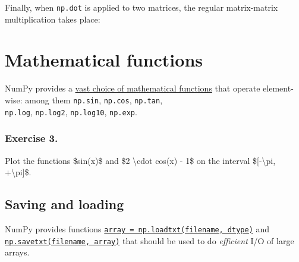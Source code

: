 \documentclass[english,serif,mathserif,xcolor=pdftex,dvipsnames,table]{beamer}
\begin{document}
\begin{Shaded}
\begin{Highlighting}[]
\end{Highlighting}
\end{Shaded}

Finally, when \texttt{np.dot} is applied to two matrices, the regular
matrix-matrix multiplication takes place:

\begin{Shaded}
\begin{Highlighting}[]
\end{Highlighting}
\end{Shaded}

\section{Mathematical functions}\label{mathematical-functions}

NumPy provides a
\href{https://docs.scipy.org/doc/numpy/reference/ufuncs.html\#available-ufuncs}{vast
choice of mathematical functions} that operate element-wise: among them
\texttt{np.sin}, \texttt{np.cos}, \texttt{np.tan},\\
\texttt{np.log}, \texttt{np.log2}, \texttt{np.log10}, \texttt{np.exp}.

\subsubsection{Exercise 3.}\label{exercise-3.}

Plot the functions \$sin(x)\$ and \$2 \textbackslash{}cdot cos(x) - 1\$
on the interval \${[}-\textbackslash{}pi, +\textbackslash{}pi{]}\$.

\begin{Shaded}
\begin{Highlighting}[]
\end{Highlighting}
\end{Shaded}

\subsection{Saving and loading}\label{saving-and-loading}

NumPy provides functions
\href{https://docs.scipy.org/doc/numpy/reference/generated/numpy.loadtxt.html\#numpy.loadtxt}{\texttt{array\ =\ np.loadtxt(filename,\ dtype)}}
and
\href{https://docs.scipy.org/doc/numpy/reference/generated/numpy.savetxt.html}{\texttt{np.savetxt(filename,\ array)}}
that should be used to do \emph{efficient} I/O of large arrays.
\end{document}
